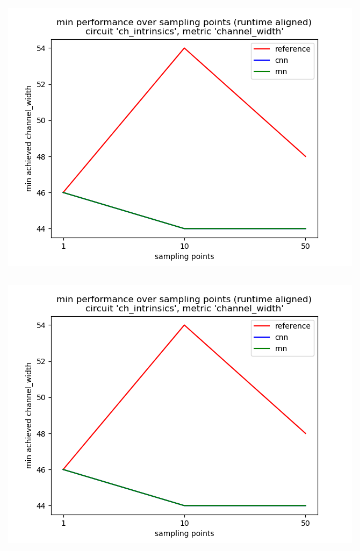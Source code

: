 \begin{figure}
	\centering
	\begin{subfigure}[b]{0.45\linewidth}
		\includegraphics[width=\linewidth]{plots/eval-ch_intrinsics-chan-width-min.png}
	\end{subfigure}
	\begin{subfigure}[b]{0.45\linewidth}
		\includegraphics[width=\linewidth]{plots/eval-ch_intrinsics-chan-width-min.png}
	\end{subfigure}
	\begin{subfigure}[b]{0.45\linewidth}

\end{subfigure}
\end{figure}

